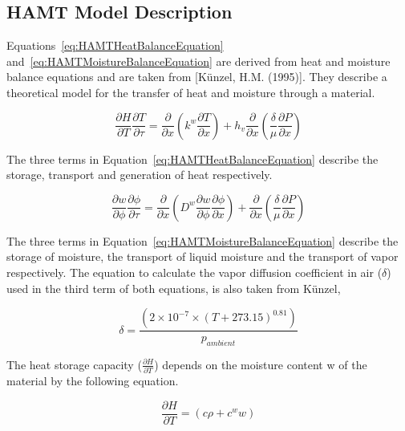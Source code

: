 \subsection{HAMT Model Description}\label{hamt-model-description}

Equations~\ref{eq:HAMTHeatBalanceEquation} and~\ref{eq:HAMTMoistureBalanceEquation} are derived from heat and moisture balance equations and are taken from {[}Künzel, H.M. (1995){]}. They describe a theoretical model for the transfer of heat and moisture through a material.

\begin{equation}
\frac{{\partial H}}{{\partial T}}\frac{{\partial T}}{{\partial \tau }} = \frac{\partial }{{\partial x}}\left( {{k^w}\frac{{\partial T}}{{\partial x}}} \right) + {h_v}\frac{\partial }{{\partial x}}\left( {\frac{\delta }{\mu }\frac{{\partial P}}{{\partial x}}} \right)
\label{eq:HAMTHeatBalanceEquation}
\end{equation}

The three terms in Equation~\ref{eq:HAMTHeatBalanceEquation} describe the storage, transport and generation of heat respectively.

\begin{equation}
\frac{{\partial w}}{{\partial \phi }}\frac{{\partial \phi }}{{\partial \tau }} = \frac{\partial }{{\partial x}}\left( {{D^w}\frac{{\partial w}}{{\partial \phi }}\frac{{\partial \phi }}{{\partial x}}} \right) + \frac{\partial }{{\partial x}}\left( {\frac{\delta }{\mu }\frac{{\partial P}}{{\partial x}}} \right)
\label{eq:HAMTMoistureBalanceEquation}
\end{equation}

The three terms in Equation~\ref{eq:HAMTMoistureBalanceEquation} describe the storage of moisture, the transport of liquid moisture and the transport of vapor respectively. The equation to calculate the vapor diffusion coefficient in air (\(\delta\)) used in the third term of both equations, is also taken from Künzel,

\begin{equation}
\delta  = \frac{{\left( {2 \times {{10}^{ - 7}} \times {{\left( {T + 273.15} \right)}^{0.81}}} \right)}}{{{p_{ambient}}}}
\end{equation}

The heat storage capacity (\(\frac{\partial H}{\partial T}\)) depends on the moisture content w of the material by the following equation.

\begin{equation}
\frac{{\partial H}}{{\partial T}} = \left( {c\rho  + {c^w}w} \right)
\end{equation}

